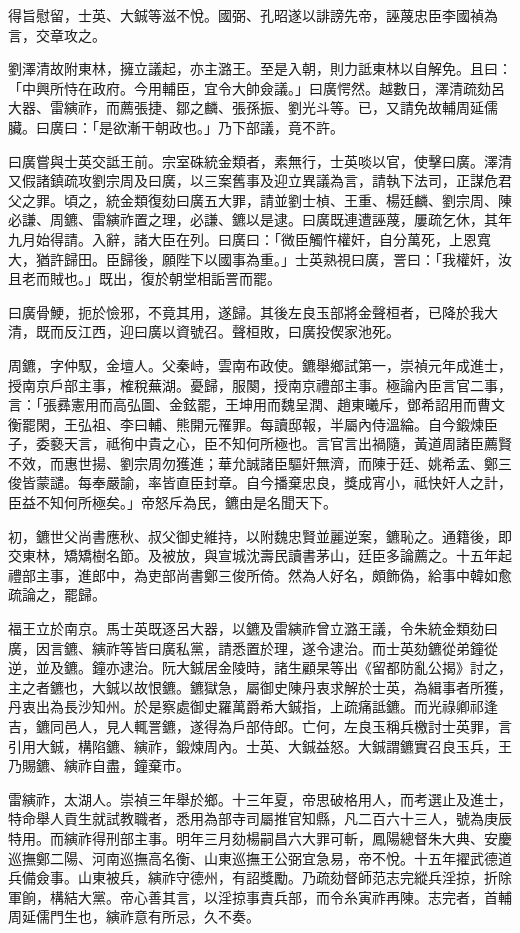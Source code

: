 \begin{pinyinscope}
得旨慰留，士英、大鋮等滋不悅。國弼、孔昭遂以誹謗先帝，誣蔑忠臣李國禎為言，交章攻之。

劉澤清故附東林，擁立議起，亦主潞王。至是入朝，則力詆東林以自解免。且曰：「中興所恃在政府。今用輔臣，宜令大帥僉議。」曰廣愕然。越數日，澤清疏劾呂大器、雷縯祚，而薦張捷、鄒之麟、張孫振、劉光斗等。已，又請免故輔周延儒臟。曰廣曰：「是欲漸干朝政也。」乃下部議，竟不許。

曰廣嘗與士英交詆王前。宗室硃統金類者，素無行，士英啖以官，使擊曰廣。澤清又假諸鎮疏攻劉宗周及曰廣，以三案舊事及迎立異議為言，請執下法司，正謀危君父之罪。頃之，統金類復劾曰廣五大罪，請並劉士楨、王重、楊廷麟、劉宗周、陳必謙、周鑣、雷縯祚置之理，必謙、鑣以是逮。曰廣既連遭誣蔑，屢疏乞休，其年九月始得請。入辭，諸大臣在列。曰廣曰：「微臣觸忤權奸，自分萬死，上恩寬大，猶許歸田。臣歸後，願陛下以國事為重。」士英熟視曰廣，詈曰：「我權奸，汝且老而賊也。」既出，復於朝堂相詬詈而罷。

曰廣骨鯁，扼於憸邪，不竟其用，遂歸。其後左良玉部將金聲桓者，已降於我大清，既而反江西，迎曰廣以資號召。聲桓敗，曰廣投偰家池死。

周鑣，字仲馭，金壇人。父秦峙，雲南布政使。鑣舉鄉試第一，崇禎元年成進士，授南京戶部主事，榷稅蕪湖。憂歸，服闋，授南京禮部主事。極論內臣言官二事，言：「張彞憲用而高弘圖、金鉉罷，王坤用而魏呈潤、趙東曦斥，鄧希詔用而曹文衡罷閑，王弘祖、李曰輔、熊開元罹罪。每讀邸報，半屬內侍溫綸。自今鍛煉臣子，委褻天言，祗徇中貴之心，臣不知何所極也。言官言出禍隨，黃道周諸臣薦賢不效，而惠世揚、劉宗周勿獲進；華允誠諸臣驅奸無濟，而陳于廷、姚希孟、鄭三俊皆蒙譴。每奉嚴諭，率皆直臣封章。自今播棄忠良，獎成宵小，祗快奸人之計，臣益不知何所極矣。」帝怒斥為民，鑣由是名聞天下。

初，鑣世父尚書應秋、叔父御史維持，以附魏忠賢並麗逆案，鑣恥之。通籍後，即交東林，矯矯樹名節。及被放，與宣城沈壽民讀書茅山，廷臣多論薦之。十五年起禮部主事，進郎中，為吏部尚書鄭三俊所倚。然為人好名，頗飾偽，給事中韓如愈疏論之，罷歸。

福王立於南京。馬士英既逐呂大器，以鑣及雷縯祚曾立潞王議，令朱統金類劾曰廣，因言鑣、縯祚等皆曰廣私黨，請悉置於理，遂令逮治。而士英劾鑣從弟鐘從逆，並及鑣。鐘亦逮治。阮大鋮居金陵時，諸生顧杲等出《留都防亂公揭》討之，主之者鑣也，大鋮以故恨鑣。鑣獄急，屬御史陳丹衷求解於士英，為緝事者所獲，丹衷出為長沙知州。於是察處御史羅萬爵希大鋮指，上疏痛詆鑣。而光祿卿祁逢吉，鑣同邑人，見人輒詈鑣，遂得為戶部侍郎。亡何，左良玉稱兵檄討士英罪，言引用大鋮，構陷鑣、縯祚，鍛煉周內。士英、大鋮益怒。大鋮謂鑣實召良玉兵，王乃賜鑣、縯祚自盡，鐘棄市。

雷縯祚，太湖人。崇禎三年舉於鄉。十三年夏，帝思破格用人，而考選止及進士，特命舉人貢生就試教職者，悉用為部寺司屬推官知縣，凡二百六十三人，號為庚辰特用。而縯祚得刑部主事。明年三月劾楊嗣昌六大罪可斬，鳳陽總督朱大典、安慶巡撫鄭二陽、河南巡撫高名衡、山東巡撫王公弼宜急易，帝不悅。十五年擢武德道兵備僉事。山東被兵，縯祚守德州，有詔獎勵。乃疏劾督師范志完縱兵淫掠，折除軍餉，構結大黨。帝心善其言，以淫掠事責兵部，而令糸寅祚再陳。志完者，首輔周延儒門生也，縯祚意有所忌，久不奏。


\end{pinyinscope}

